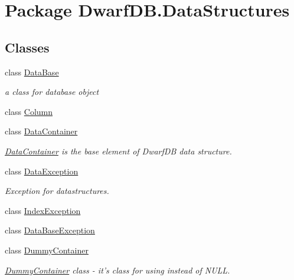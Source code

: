 \hypertarget{namespace_dwarf_d_b_1_1_data_structures}{
\section{Package DwarfDB.DataStructures}
\label{namespace_dwarf_d_b_1_1_data_structures}
}
\subsection*{Classes}
\begin{DoxyCompactItemize}
\item 
class \hyperlink{class_dwarf_d_b_1_1_data_structures_1_1_data_base}{DataBase}
\begin{DoxyCompactList}\small\item\em a class for database object \item\end{DoxyCompactList}\item 
class \hyperlink{class_dwarf_d_b_1_1_data_structures_1_1_column}{Column}
\item 
class \hyperlink{class_dwarf_d_b_1_1_data_structures_1_1_data_container}{DataContainer}
\begin{DoxyCompactList}\small\item\em \hyperlink{class_dwarf_d_b_1_1_data_structures_1_1_data_container}{DataContainer} is the base element of DwarfDB data structure. \item\end{DoxyCompactList}\item 
class \hyperlink{class_dwarf_d_b_1_1_data_structures_1_1_data_exception-g}{DataException}
\begin{DoxyCompactList}\small\item\em Exception for datastructures. \item\end{DoxyCompactList}\item 
class \hyperlink{class_dwarf_d_b_1_1_data_structures_1_1_index_exception}{IndexException}
\item 
class \hyperlink{class_dwarf_d_b_1_1_data_structures_1_1_data_base_exception}{DataBaseException}
\item 
class \hyperlink{class_dwarf_d_b_1_1_data_structures_1_1_dummy_container}{DummyContainer}
\begin{DoxyCompactList}\small\item\em \hyperlink{class_dwarf_d_b_1_1_data_structures_1_1_dummy_container}{DummyContainer} class -\/ it's class for using instead of NULL. \item\end{DoxyCompactList}\item 

\end{DoxyCompactItemize}

